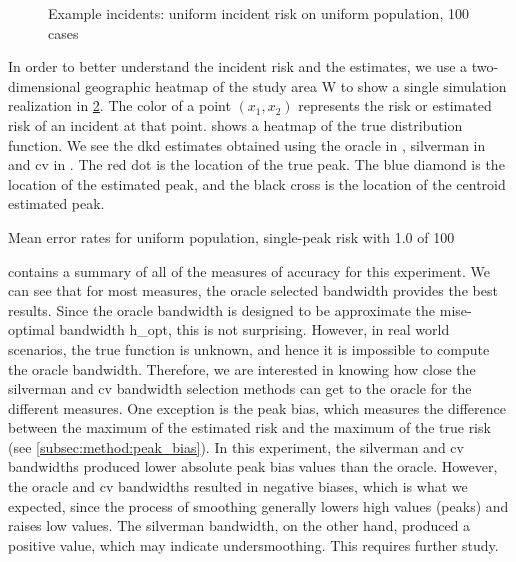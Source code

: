 \begin{figure}[htbp]
\begin{subfigure}[b]{0.45\textwidth}
        \label{fig:cases_heatmap:unif_100_1.0_1h:cv}
    \end{subfigure}
    \caption[Example incidents: uniform incident risk on uniform population, 100 cases]
        {Example incidents: uniform incident risk on uniform population, 100 cases}
    \label{fig:cases_heatmap:unif_100_1.0_1h}
\end{figure}

In order to better understand the incident risk and the estimates,
we use a two-dimensional geographic heatmap of the study area \gls{W} to show a single simulation realization in
\cref{fig:cases_heatmap:unif_100_1.0_1h}.
The color of a point $(x_1, x_2)$ represents the risk or estimated risk of an incident at that point.
 shows a heatmap of the true distribution function.
We see the \gls{dkd} estimates obtained using the \gls{oracle} in ,
\gls{silverman} in  and \gls{cv} in .
The red dot is the location of the true peak.
The blue diamond is the location of the estimated peak,
and the black cross is the location of the centroid estimated peak.

\begin{table}[htbp]
    \centering
    
    \caption{Mean error rates for uniform population, single-peak risk with  1.0 of  100}
    \label{tab:errors:unif_100_1.0_1h}
\end{table}

 contains a summary of all of the measures of accuracy for this experiment.
We can see that for most measures, the \gls{oracle} selected bandwidth provides the best results.
Since the \gls{oracle} bandwidth is designed to be approximate the \gls{mise}-optimal bandwidth \gls{h_opt},
this is not surprising.
However, in real world scenarios, the true function is unknown, and hence it is impossible to compute the \gls{oracle} bandwidth.
Therefore, we are interested in knowing how close the \gls{silverman} and \gls{cv} bandwidth selection methods can get to the \gls{oracle} for the different measures.
One exception is the \gls{peak bias}, which measures the difference between the maximum of the estimated risk and the maximum of the true risk (see \cref{subsec:method:peak_bias}).
In this experiment, the \gls{silverman} and \gls{cv} bandwidths produced lower absolute \gls{peak bias} values than the \gls{oracle}. 
However, the \gls{oracle} and \gls{cv} bandwidths resulted in negative biases,
which is what we expected,
since the process of smoothing generally lowers high values (peaks) and raises low values.
The \gls{silverman} bandwidth, on the other hand, produced a positive value,
which may indicate undersmoothing.
This requires further study.

